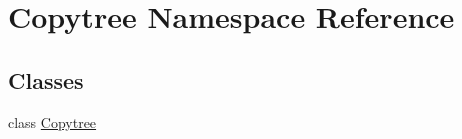 \hypertarget{namespaceCopytree}{\section{Copytree Namespace Reference}
\label{namespaceCopytree}
}
\subsection*{Classes}
\begin{DoxyCompactItemize}
\item 
class \hyperlink{classCopytree_1_1Copytree}{Copytree}
\end{DoxyCompactItemize}
